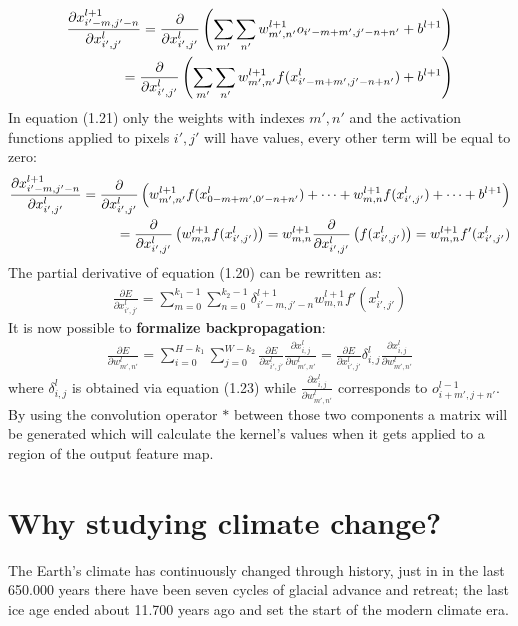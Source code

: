 \documentclass[11pt,a4paper,titlepage]{book}
\begin{document}
\begin{align}
   \notag \frac{\partial x_{i'-m,j'-n}^{l+1}}{\partial x_{i',j'}^{l}} = \frac{\partial}{\partial x_{i',j'}^{l}} \left( \sum_{m'} \sum_{n'} w_{m',n'}^{l+1} o_{i'-m+m', j'-n+n'} + b^{l+1} \right) \\ 
   = \frac{\partial}{\partial x_{i',j'}^{l}} \left( \sum_{m'} \sum_{n'} w_{m',n'}^{l+1} f(x_{i'-m+m', j'-n+n'}^l) + b^{l+1} \right) 
\end{align}
In equation (1.21) only the weights with indexes $m',n'$ and the activation functions applied to pixels $i',j'$ will have values, every other term will be equal to zero:
\begin{align}
    \notag \frac{\partial x_{i'-m,j'-n}^{l+1}}{\partial x_{i',j'}^l} = \frac{\partial}{\partial x_{i',j'}^{l}} \left( w_{m',n'}^{l+1} f(x_{0-m+m', 0'-n+n'}^l) + \dots + w_{m,n}^{l+1}f(x_{i',j'}^l) + \dots + b^{l+1}\right) \\
    = \frac{\partial}{\partial x_{i',j'}^{l}} \left( w_{m,n}^{l+1} f(x_{i',j'}^l) \right) = w_{m,n}^{l+1}\frac{\partial}{\partial x_{i',j'}^{l}}\left( f(x_{i',j'}^l) \right) = w_{m,n}^{l+1} f'(x_{i',j'}^l)
\end{align}
The partial derivative of equation (1.20) can be rewritten as:
\begin{align}
    \frac{\partial E}{\partial x_{i',j'}^l} = \sum_{m=0}^{k_1-1} \sum_{n=0}^{k_2-1} \delta_{i'-m, j'-n}^{l+1} w_{m,n}^{l+1} f'(x_{i',j'}^l)
\end{align}
It is now possible to \textbf{formalize backpropagation}:
\begin{align}
    \frac{\partial E}{\partial w_{m',n'}^l} = \sum_{i=0}^{H-k_1} \sum_{j=0}^{W-k_2} \frac{\partial E}{\partial x_{i',j'}^l} \frac{\partial x_{i,j}^l}{\partial w_{m',n'}^l} = \frac{\partial E}{\partial x_{i',j'}^l} \delta_{i,j}^l \frac{\partial x_{i,j}^l}{\partial w_{m',n'}^l}
\end{align}
where $\delta_{i,j}^l$ is obtained via equation (1.23) while $\frac{\partial x_{i,j}^l}{\partial w_{m',n'}^l}$ corresponds to $o_{i+m',j+n'}^{l-1}$. By using the convolution operator $*$ between those two components a matrix will be generated which will calculate the kernel's values when it gets applied to a region of the output feature map.

\section{Why studying climate change?}
The Earth's climate has continuously changed through history, just in in the last 650.000 years there have been seven cycles of glacial advance and retreat; the last ice age ended about 11.700 years ago and set the start of the modern climate era.
\end{document}
